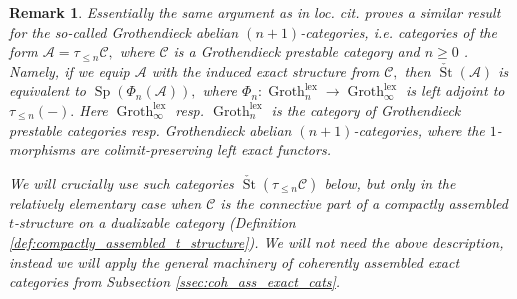 \documentclass[11pt,leqno]{amsart}
\newtheorem{remark}[theo]{Remark}
\numberwithin{equation}{section}
\newcommand{\lex}{\operatorname{lex}}
\newcommand{\Groth}{\operatorname{Groth}}
\newcommand{\St}{\operatorname{St}}
\newcommand{\cA}{{\mathcal A}}
\newcommand{\cC}{{\mathcal C}}
\newcommand{\cE}{{\mathcal E}}
\newcommand{\Sp}{\operatorname{Sp}}
\begin{document}
\begin{remark}
Essentially the same argument as in loc. cit. proves a similar result for the so-called Grothendieck abelian $(n+1)$-categories, i.e. categories of the form $\cA=\tau_{\leq n}\cC,$ where $\cC$ is a Grothendieck prestable category and $n\geq 0$ \cite[Definition C.5.4.1]{Lur18}. Namely, if we equip $\cA$ with the induced exact structure from $\cC,$ then $\check{\St}(\cA)$ is equivalent to $\Sp(\Phi_n(\cA)),$ where $\Phi_n:\Groth_n^{\lex}\to\Groth_{\infty}^{\lex}$ is left adjoint to $\tau_{\leq n}(-).$ Here $\Groth_{\infty}^{\lex}$ resp. $\Groth_n^{\lex}$ is the category of Grothendieck prestable categories resp. Grothendieck abelian $(n+1)$-categories, where the $1$-morphisms are colimit-preserving left exact functors.

We will crucially use such categories $\check{\St}(\tau_{\leq n}\cC)$ below, but only in the relatively elementary case when $\cC$ is the connective part of a compactly assembled $t$-structure on a dualizable category (Definition \ref{def:compactly_assembled_t_structure}). We will not need the above description, instead we will apply the general machinery of coherently assembled exact categories from Subsection \ref{ssec:coh_ass_exact_cats}.
\end{remark}



\end{document}
